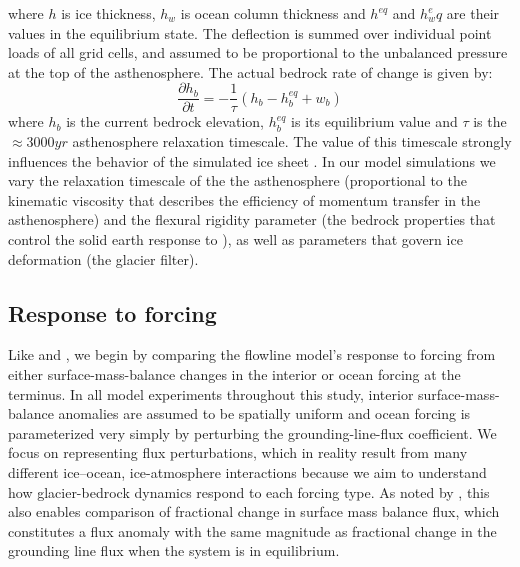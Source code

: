 \documentclass[tc, manuscript]{copernicus}
\begin{document}
where $h$ is ice thickness, $h_w$ is ocean column thickness and $h^{eq}$ and $h_w^eq$ are their values in the equilibrium state. The deflection is summed over individual point loads of all grid cells, and assumed to be proportional to the unbalanced pressure at the top of the asthenosphere. The actual bedrock rate of change is given by:
\begin{equation}
\frac{\partial h_b}{\partial t} = -\frac{1}{\tau} \left(h_b - h_b^{eq} + w_b \right)
\end{equation}
where $h_b$ is the current bedrock elevation, $h_b^{eq}$ is its equilibrium value and $\tau$ is the $\approx 3000yr$ asthenosphere relaxation timescale. The value of this timescale strongly influences the behavior of the simulated ice sheet \citet{oerlemans1980b}. In our model simulations we vary the relaxation timescale of the the asthenosphere (proportional to the kinematic viscosity that describes the efficiency of momentum transfer in the asthenosphere) and the flexural rigidity parameter (the bedrock properties that control the solid earth response to ), as well as parameters that govern ice deformation (the glacier filter).

\subsection{Response to forcing}

Like \citet{christian2020} and \citet{robel2018}, we begin by comparing the flowline model's response to forcing from either surface-mass-balance changes in the interior or ocean forcing at the terminus. In all model experiments throughout this study, interior surface-mass-balance anomalies are assumed to be spatially uniform and ocean forcing is parameterized very simply by perturbing the grounding-line-flux coefficient. We focus on representing flux perturbations, which in reality result from many different ice–ocean, ice-atmosphere interactions because we aim to understand how glacier-bedrock dynamics respond to each forcing type. As noted by \citet{christian2020}, this also enables comparison of fractional change in surface mass balance flux, which constitutes a flux anomaly with the same magnitude as fractional change in the grounding line flux when the system is in equilibrium.
\end{document}
